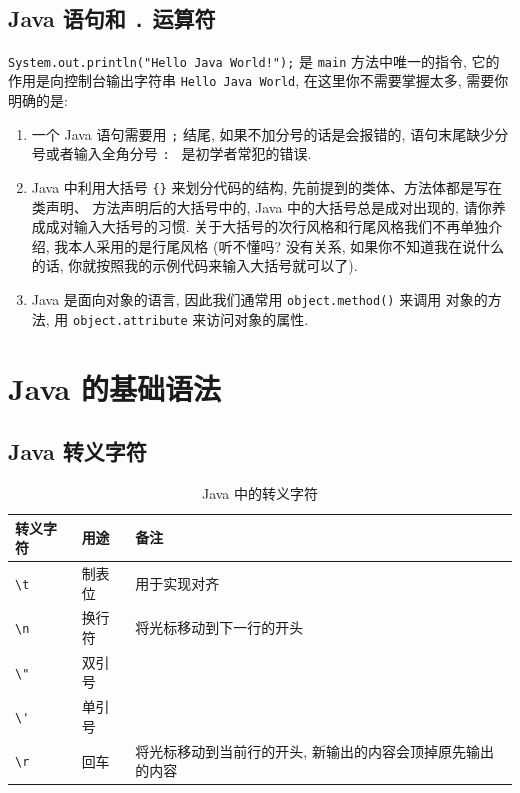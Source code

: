 \documentclass[10pt,UTF8]{book} %
\begin{document}

\subsection{Java 语句和 \lstinline|.| 运算符}

\lstinline|System.out.println("Hello Java World!");| 是 \lstinline|main|
方法中唯一的指令, 它的作用是向控制台输出字符串 \lstinline|Hello Java World|,
在这里你不需要掌握太多, 需要你明确的是:

\begin{enumerate}
    \item 一个 Java 语句需要用 \lstinline|;| 结尾, 如果不加分号的话是会报错的,
    语句末尾缺少分号或者输入全角分号 \lstinline|: | 是初学者常犯的错误.
    
    \item Java 中利用大括号 \lstinline|{}| 来划分代码的结构, 先前提到的类体、方法体都是写在类声明、
    方法声明后的大括号中的, Java 中的大括号总是成对出现的, 请你养成成对输入大括号的习惯.
    关于大括号的次行风格和行尾风格我们不再单独介绍,
    我本人采用的是行尾风格 (听不懂吗?
    没有关系, 如果你不知道我在说什么的话, 你就按照我的示例代码来输入大括号就可以了).
    
    \item Java 是面向对象的语言, 因此我们通常用 \lstinline|object.method()| 来调用
    对象的方法, 用 \lstinline|object.attribute| 来访问对象的属性.
\end{enumerate}

\section{Java 的基础语法}

\subsection{Java 转义字符}

\begin{table}[H]
    \caption{Java 中的转义字符}
    \centering
    \begin{tabular}{l l p{6cm}}
        \hline
        转义字符 & 用途 & 备注 \\
        \hline
        \lstinline|\t| & 制表位 & 用于实现对齐 \\
        \lstinline|\n| & 换行符 & 将光标移动到下一行的开头 \\
        \lstinline|\"| & 双引号 \\
        \lstinline|\'| & 单引号 \\
        \lstinline|\r| & 回车   & 将光标移动到当前行的开头, 新输出的内容会顶掉原先输出的内容 \\
        \hline
    \end{tabular}
\end{table}
\end{document}
